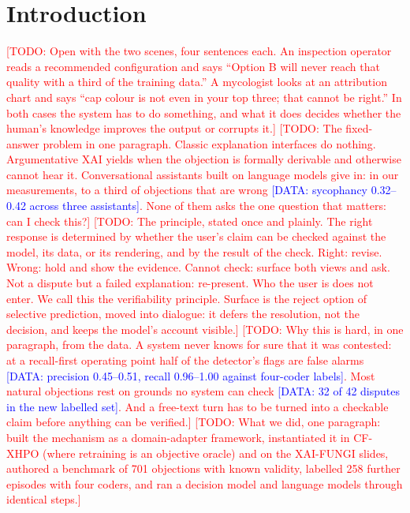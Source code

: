 \documentclass[preprint,12pt,3p,times]{elsarticle}
\newcommand{\todo}[1]{\textcolor{red}{[TODO: #1]}}
\newcommand{\done}[1]{\textcolor{blue}{[DATA: #1]}}   %
\begin{document}
\section{Introduction}
\todo{Open with the two scenes, four sentences each. An inspection operator reads a recommended configuration and says ``Option B will never reach that quality with a third of the training data.'' A mycologist looks at an attribution chart and says ``cap colour is not even in your top three; that cannot be right.'' In both cases the system has to do something, and what it does decides whether the human's knowledge improves the output or corrupts it.}
\todo{The fixed-answer problem in one paragraph. Classic explanation interfaces do nothing. Argumentative XAI yields when the objection is formally derivable and otherwise cannot hear it. Conversational assistants built on language models give in: in our measurements, to a third of objections that are wrong \done{sycophancy 0.32--0.42 across three assistants}. None of them asks the one question that matters: can I check this?}
\todo{The principle, stated once and plainly. The right response is determined by whether the user's claim can be checked against the model, its data, or its rendering, and by the result of the check. Right: revise. Wrong: hold and show the evidence. Cannot check: surface both views and ask. Not a dispute but a failed explanation: re-present. Who the user is does not enter. We call this the verifiability principle. Surface is the reject option of selective prediction, moved into dialogue: it defers the resolution, not the decision, and keeps the model's account visible.}
\todo{Why this is hard, in one paragraph, from the data. A system never knows for sure that it was contested: at a recall-first operating point half of the detector's flags are false alarms \done{precision 0.45--0.51, recall 0.96--1.00 against four-coder labels}. Most natural objections rest on grounds no system can check \done{32 of 42 disputes in the new labelled set}. And a free-text turn has to be turned into a checkable claim before anything can be verified.}
\todo{What we did, one paragraph: built the mechanism as a domain-adapter framework, instantiated it in CF-XHPO (where retraining is an objective oracle) and on the XAI-FUNGI slides, authored a benchmark of 701 objections with known validity, labelled 258 further episodes with four coders, and ran a decision model and language models through identical steps.}
\end{document}
